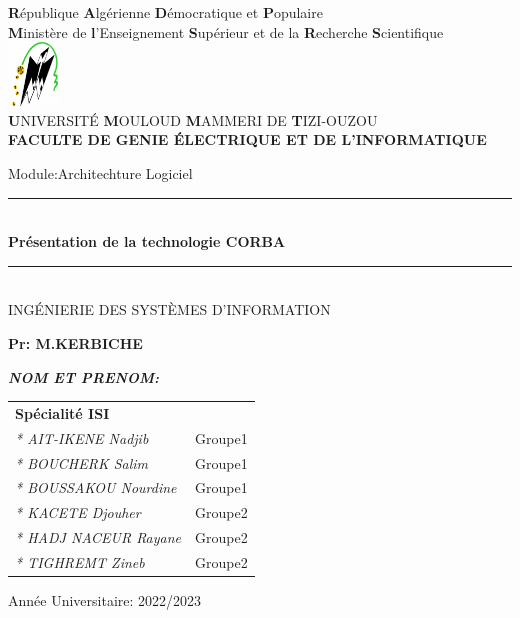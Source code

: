 \thispagestyle{empty}

\begin{center} 

\large \textbf{R}épublique \textbf{A}lgérienne \textbf{D}émocratique et \textbf{P}opulaire\\
\textbf{M}inistère de\textbf{ l}’Enseignement \textbf{S}upérieur et de la\textbf{ R}echerche \textbf{S}cientifique\\
\includegraphics[width=0.1\textwidth]{pdg/ummto.png}\\
\textbf{U}NIVERSITÉ \textbf{M}OULOUD \textbf{M}AMMERI DE \textbf{T}IZI-OUZOU\\
\textbf{ FACULTE DE GENIE ÉLECTRIQUE ET DE L’INFORMATIQUE}\\\vfill


\end{center}


\begin{center}
    \huge Module:Architechture Logiciel\normalsize\\
 
    \rule{0.90\textwidth}{2pt}\\
    \LARGE \textbf
    {Présentation de la technologie \textbf{CORBA}}\\
    \normalsize
    \rule{0.90\textwidth}{2pt}\\
    \large INGÉNIERIE DES SYSTÈMES D'INFORMATION \\
    \vfill
    \begin{flushright}
     \large \textbf {Pr: M.KERBICHE} \\
    \end{flushright}
  \vfill
 
 
\begin{flushleft}   
 \large\emph{\textbf{NOM ET PRENOM:}}\\
 \begin{tabular}{ll}
  \hline \hline
    \textbf{ Spécialité ISI} \\   
      \emph{* AIT-IKENE Nadjib}    & Groupe1 \\ 
      \emph{* BOUCHERK Salim}   &  Groupe1\\
      \emph{* BOUSSAKOU Nourdine} &Groupe1\\
      \emph{* KACETE Djouher} &     Groupe2 \\
      \emph{* HADJ NACEUR Rayane} &  Groupe2\\
      \emph{* TIGHREMT Zineb} & Groupe2\\
   \hline \hline
\end{tabular}
\end{flushleft}
\vfill 

\begin{flushright}
\large Année Universitaire: 2022/2023\\
\end{flushright}
   
\end{center}
    
%
